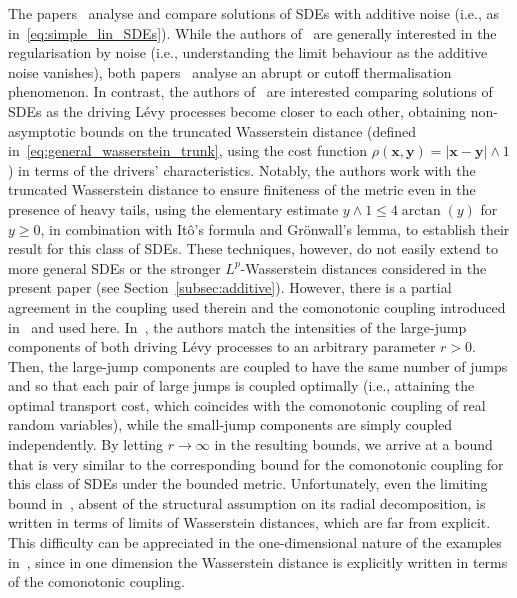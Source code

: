 \documentclass[en,oneside,bbfont,article]{amsart}
\theoremstyle{remark}
\theoremstyle{definition}
\theoremstyle{definition}
\newcommand\1{\mathds{1}}
\renewcommand\le{\leqslant}
\renewcommand\ge{\geqslant}
\begin{document}
The papers~\cite{MR3332269,MR4307706,MR4791608} analyse and compare solutions of SDEs with additive noise (i.e., as in~\eqref{eq:simple_lin_SDEs}). While the authors of~\cite{MR4307706} are generally interested in the regularisation by noise (i.e., understanding the limit behaviour as the additive noise vanishes), both papers~\cite{MR4307706,MR4791608} analyse an abrupt or cutoff thermalisation phenomenon. In contrast, the authors of~\cite{MR3332269} are interested comparing solutions of SDEs as the driving L\'evy processes become closer to each other, obtaining non-asymptotic bounds on the truncated Wasserstein distance (defined in~\eqref{eq:general_wasserstein_trunk}, using the cost function $\rho(\bm{x},\bm{y}) = |\bm{x} - \bm{y}| \wedge 1$) in terms of the drivers' characteristics. Notably, the authors work with the truncated Wasserstein distance to ensure finiteness of the metric even in the presence of heavy tails, using the elementary estimate $y \wedge 1 \le 4\arctan(y)$ for $y \ge 0$, in combination with It\^o's formula and Gr\"onwall's lemma, to establish their result for this class of SDEs. These techniques, however, do not easily extend to more general SDEs or the stronger $L^p$-Wasserstein distances considered in the present paper (see Section~\ref{subsec:additive}). However, there is a partial agreement in the coupling used therein and the comonotonic coupling introduced in~\cite{WassersteinPaper} and used here. In~\cite{MR3332269}, the authors match the intensities of the large-jump components of both driving L\'evy processes to an arbitrary parameter $r>0$. Then, the large-jump components are coupled to have the same number of jumps and so that each pair of large jumps is coupled optimally (i.e., attaining the optimal transport cost, which coincides with the comonotonic coupling of real random variables), while the small-jump components are simply coupled independently. By letting $r\to\infty$ in the resulting bounds, we arrive at a bound that is very similar to the corresponding bound for the comonotonic coupling for this class of SDEs under the bounded metric. Unfortunately, even the limiting bound in~\cite{MR3332269}, absent of the structural assumption on its radial decomposition, is written in terms of limits of Wasserstein distances, which are far from explicit. This difficulty can be appreciated in the one-dimensional nature of the examples in~\cite{MR3332269}, since in one dimension the Wasserstein distance is explicitly written in terms of the comonotonic coupling.
\end{document}
